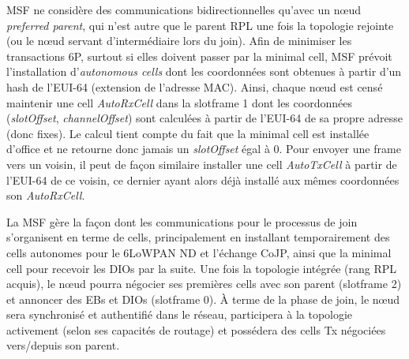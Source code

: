 \documentclass[]{report}
\begin{document}
\vspace{0.4cm}

\par MSF ne considère des communications bidirectionnelles qu'avec un nœud \textit{preferred parent}, qui n'est autre que le parent RPL une fois la topologie rejointe (ou le nœud servant d'intermédiaire lors du join). Afin de minimiser les transactions 6P, surtout si elles doivent passer par la minimal cell, MSF prévoit l'installation d'\textit{autonomous cells} dont les coordonnées sont obtenues à partir d'un hash de l'EUI-64 (extension de l'adresse MAC). Ainsi, chaque nœud est censé maintenir une cell \textit{AutoRxCell} dans la slotframe 1 dont les coordonnées (\textit{slotOffset}, \textit{channelOffset}) sont calculées à partir de l'EUI-64 de sa propre adresse (donc fixes). Le calcul tient compte du fait que la minimal cell est installée d'office et ne retourne donc jamais un \textit{slotOffset} égal à 0. Pour envoyer une frame vers un voisin, il peut de façon similaire installer une cell \textit{AutoTxCell} à partir de l'EUI-64 de ce voisin, ce dernier ayant alors déjà installé aux mêmes coordonnées son \textit{AutoRxCell}.\\

\par La MSF gère la façon dont les communications pour le processus de join s'organisent en terme de cells, principalement en installant temporairement des cells autonomes pour le 6LoWPAN ND et l'échange CoJP, ainsi que la minimal cell pour recevoir les DIOs par la suite. Une fois la topologie intégrée (rang RPL acquis), le nœud pourra négocier ses premières cells avec son parent (slotframe 2) et annoncer des EBs et DIOs (slotframe 0). À terme de la phase de join, le nœud sera synchronisé et authentifié dans le réseau, participera à la topologie activement (selon ses capacités de routage) et possédera des cells Tx négociées vers/depuis son parent.\\
\end{document}

